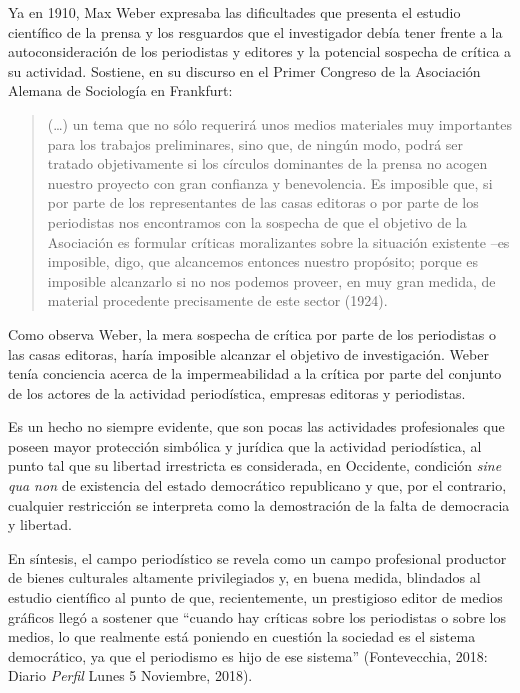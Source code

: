 Ya en 1910, Max Weber expresaba las dificultades que presenta el estudio científico de la prensa y los resguardos que el investigador debía tener frente a la autoconsideración de los periodistas y editores y la potencial sospecha de crítica a su actividad. Sostiene, en su discurso en el Primer Congreso de la Asociación Alemana de Sociología en Frankfurt:

\begin{quote}
	(\dots) un tema que no sólo requerirá unos medios materiales muy importantes para los trabajos preliminares, sino que, de ningún modo, podrá ser tratado objetivamente si los círculos dominantes de la prensa no acogen nuestro proyecto con gran confianza y benevolencia. Es imposible que, si por parte de los representantes de las casas editoras o por parte de los periodistas nos encontramos con la sospecha de que el objetivo de la Asociación es formular críticas moralizantes sobre la situación existente --es imposible, digo, que alcancemos entonces nuestro propósito; porque es imposible alcanzarlo si no nos podemos proveer, en muy gran medida, de material procedente precisamente de este sector (1924).
\end{quote}


Como observa Weber, la mera sospecha de crítica por parte de los periodistas o las casas editoras, haría imposible alcanzar el objetivo de investigación. Weber tenía conciencia acerca de la impermeabilidad a la crítica por parte del conjunto de los actores de la actividad periodística, empresas editoras y periodistas.

Es un hecho no siempre evidente, que son pocas las actividades profesionales que poseen mayor protección simbólica y jurídica que la actividad periodística, al punto tal que su libertad irrestricta es considerada, en Occidente, condición \emph{sine qua non} de existencia del estado democrático republicano y que, por el contrario, cualquier restricción se interpreta como la demostración de la falta de democracia y libertad.

En síntesis, el campo periodístico se revela como un campo profesional productor de bienes culturales altamente privilegiados y, en buena medida, blindados al estudio científico al punto de que, recientemente, un prestigioso editor de medios gráficos llegó a sostener que ``cuando hay críticas sobre los periodistas o sobre los medios, lo que realmente está poniendo en cuestión la sociedad es el sistema democrático, ya que el periodismo es hijo de ese sistema'' (Fontevecchia, 2018: Diario \emph{Perfil} Lunes 5 Noviembre, 2018).

